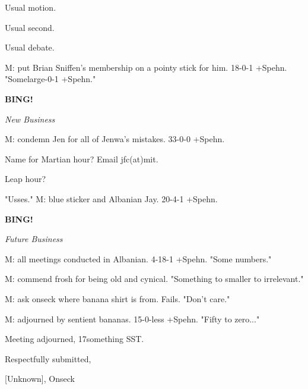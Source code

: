 \documentclass[12pt]{article}
\newcommand{\bing}{{\bf BING!} }
\newcommand{\goto}[1]{\bing \vskip 12pt \centerline{{\em{#1}}}}
\begin{document}
Usual motion.

Usual second.

Usual debate.

M: put Brian Sniffen's membership on a pointy stick for him. 18-0-1 +Spehn. "Somelarge-0-1 +Spehn."

\goto{New Business}

M: condemn Jen for all of Jenwa's mistakes. 33-0-0 +Spehn.

Name for Martian hour? Email jfc(at)mit.

Leap hour?

"Usses." M: blue sticker and Albanian Jay. 20-4-1 +Spehn.

\goto{Future Business}

M: all meetings conducted in Albanian. 4-18-1 +Spehn. "Some numbers."

M: commend frosh for being old and cynical. "Something to smaller to irrelevant."

M: ask onseck where banana shirt is from. Fails. "Don't care."

M: adjourned by sentient bananas. 15-0-less +Spehn. "Fifty to zero..."

\vspace{12pt}

\noindent
Meeting adjourned, 17something SST.

\vspace{18pt}

\centerline{Respectfully submitted,}
\centerline{[Unknown], Onseck}
\end{document}
